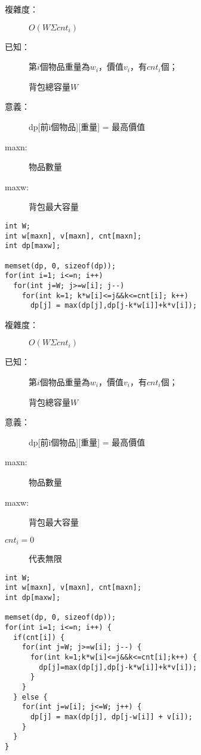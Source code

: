 \begin{center}
  \underline{    }
\end{center}
\begin{description}
  \item[複雜度：] $O(W\Sigma cnt_i)$
  \item[已知：] 第$i$個物品重量為$w_i$，價值$v_i$，有$cnt_i$個；\par
                背包總容量$W$
  \item[意義：] dp[前i個物品][重量] = 最高價值
  \item[maxn:] 物品數量
  \item[maxw:] 背包最大容量
\end{description}
\begin{lstlisting}
int W;
int w[maxn], v[maxn], cnt[maxn];
int dp[maxw];

memset(dp, 0, sizeof(dp));
for(int i=1; i<=n; i++)
  for(int j=W; j>=w[i]; j--)
    for(int k=1; k*w[i]<=j&&k<=cnt[i]; k++)
      dp[j] = max(dp[j],dp[j-k*w[i]]+k*v[i]);
\end{lstlisting}

\begin{center}
  \underline{    }
\end{center}
\begin{description}
  \item[複雜度：] $O(W\Sigma cnt_i)$
  \item[已知：] 第$i$個物品重量為$w_i$，價值$v_i$，有$cnt_i$個；\par
                背包總容量$W$
  \item[意義：] dp[前i個物品][重量] = 最高價值
  \item[maxn:] 物品數量
  \item[maxw:] 背包最大容量
  \item[$cnt_i=0$] 代表無限 
\end{description}
\begin{lstlisting}
int W;
int w[maxn], v[maxn], cnt[maxn];
int dp[maxw];

memset(dp, 0, sizeof(dp));
for(int i=1; i<=n; i++) {
  if(cnt[i]) {
    for(int j=W; j>=w[i]; j--) {
      for(int k=1;k*w[i]<=j&&k<=cnt[i];k++) {
        dp[j]=max(dp[j],dp[j-k*w[i]]+k*v[i]);
      }
    }
  } else {
    for(int j=w[i]; j<=W; j++) {
      dp[j] = max(dp[j], dp[j-w[i]] + v[i]);
    }
  }
}
\end{lstlisting}

